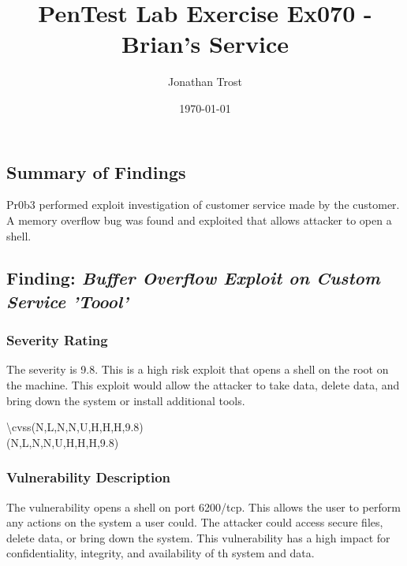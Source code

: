 \documentclass[notitlepage]{article}
\begin{document}
	
	
	\title{PenTest Lab Exercise Ex070 - Brian's Service}
	\author{Jonathan Trost}
	\date{\isodate\today}
	
	\maketitle
	
	\tableofcontents
	
	\newpage
	
	\subsection{Summary of Findings}
	\indent Pr0b3 performed exploit investigation of customer service made by the customer.  A memory overflow bug was found and exploited that allows attacker to open a shell.
	
	\subsection{Finding: \emph{Buffer Overflow Exploit on Custom Service 'Toool'}}
	
	\subsubsection{Severity Rating}
	\indent The severity is 9.8. This is a high risk exploit that opens a shell on the root on the machine.  This exploit would allow the attacker to take data, delete data, and bring down the system or install additional tools.  

	\textbackslash cvss(N,L,N,N,U,H,H,H,9.8)\\
	\cvss(N,L,N,N,U,H,H,H,9.8) \\
	
	\subsubsection{Vulnerability Description}
	\indent The vulnerability opens a shell on port 6200/tcp. This allows the user to perform any actions on the system a user could. The attacker could access secure files, delete data, or bring down the system. This vulnerability has a high impact for confidentiality, integrity, and availability of th system and data. 
	
\end{document}
